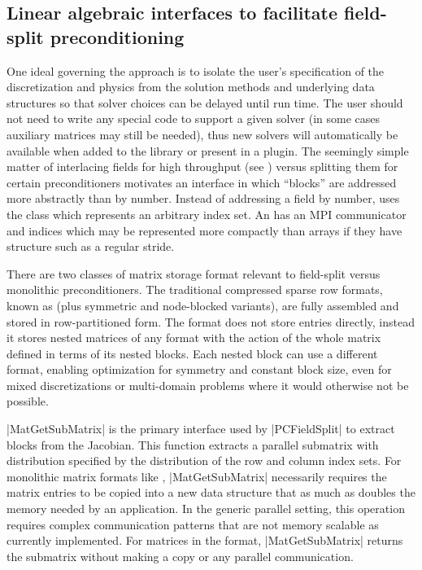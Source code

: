 \subsection{Linear algebraic interfaces to facilitate field-split preconditioning}\label{sec:multiphysics:algebraic}
One ideal governing the {\PETSc} approach is to isolate the user's specification of the discretization and physics from the solution methods and underlying data structures so that solver choices can be delayed until run time.
The user should not need to write any special code to support a given solver (in some cases auxiliary matrices may still be needed), thus new solvers will automatically be available when added to the library or present in a plugin.
The seemingly simple matter of interlacing fields for high throughput (see ) versus splitting them for certain preconditioners motivates an interface in which ``blocks'' are addressed more abstractly than by number.
Instead of addressing a field by number, {\PETSc} uses the  class which represents an arbitrary index set.
An  has an MPI communicator and indices which may be represented more compactly than arrays if they have structure such as a regular stride.

There are two classes of matrix storage format relevant to field-split versus monolithic preconditioners.
The traditional compressed sparse row formats, known as  (plus symmetric and node-blocked variants), are fully assembled and stored in row-partitioned form.
The  format does not store entries directly, instead it stores nested matrices of any format with the action of the whole matrix defined in terms of its nested blocks.
Each nested block can use a different format, enabling optimization for symmetry and constant block size, even for mixed discretizations or multi-domain problems where it would otherwise not be possible.

\cfunc|MatGetSubMatrix| is the primary interface used by \cverb|PCFieldSplit| to extract blocks from the Jacobian.
This function extracts a parallel submatrix with distribution specified by the distribution of the row and column index sets.
For monolithic matrix formats like , \cfunc|MatGetSubMatrix| necessarily requires the matrix entries to be copied into a new data structure that as much as doubles the memory needed by an application.
In the generic parallel setting, this operation requires complex communication patterns that are not memory scalable as currently implemented.
For matrices in the  format, \cfunc|MatGetSubMatrix| returns the submatrix without making a copy or any parallel communication.

